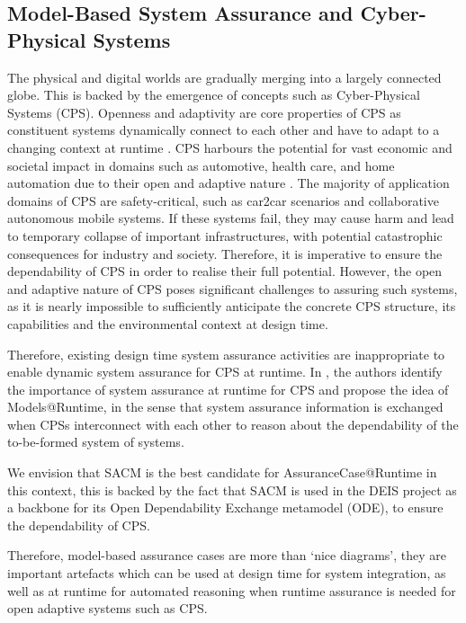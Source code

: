 \subsection{Model-Based System Assurance and Cyber-Physical Systems}
The physical and digital worlds are gradually merging into a largely connected globe. 
This is backed by the emergence of concepts such as Cyber-Physical Systems (CPS).
Openness and adaptivity are core properties of CPS as constituent systems dynamically connect to each other and have to adapt to a changing context at runtime \cite{trapp2013safety}.
CPS harbours the potential for vast economic and societal impact in domains such as automotive, health care, and home automation due to their open and adaptive nature \cite{wei2017deis}.
The majority of application domains of CPS are safety-critical, such as car2car scenarios and collaborative autonomous mobile systems.
If these systems fail, they may cause harm and lead to temporary collapse of important infrastructures, with potential catastrophic consequences for industry and society.
Therefore, it is imperative to ensure the dependability of CPS in order to realise their full potential. 
However, the open and adaptive nature of CPS poses significant challenges to assuring such systems, as it is nearly impossible to sufficiently anticipate the concrete CPS structure, its capabilities and the environmental context at design time.

Therefore, existing design time system assurance activities are inappropriate to enable dynamic system assurance for CPS at runtime. 
In \cite{trapp2013safety}, the authors identify the importance of system assurance at runtime for CPS and propose the idea of Models@Runtime, in the sense that system assurance information is exchanged when CPSs interconnect with each other to reason about the dependability of the to-be-formed system of systems.

We envision that SACM is the best candidate for AssuranceCase@Runtime in this context, this is backed by the fact that SACM is used in the DEIS project \cite{wei2017deis} as a backbone for its Open Dependability Exchange metamodel (ODE), to ensure the dependability of CPS. 


%
Therefore, model-based assurance cases are more than `nice diagrams', they are important artefacts which can be used at design time for system integration, as well as at runtime for automated reasoning when runtime assurance is needed for open adaptive systems such as CPS. 

